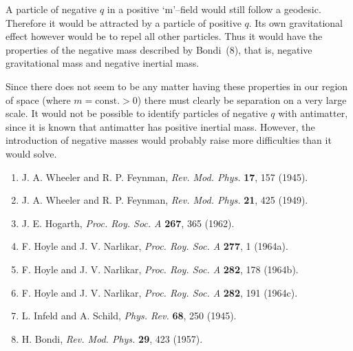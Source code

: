 A particle of negative \(q\) in a positive `m'--field would 
still follow a geodesic. Therefore it would be attracted by 
a particle of positive \(q\). Its own gravitational effect 
however would be to repel all other particles. Thus it would 
have the properties of the negative mass described by Bondi~(8), 
that is, negative gravitational mass and negative inertial mass.

\medskip

Since there does not seem to be any matter having these 
properties in our region of space (where \(m = \text{const.} > 0\)) 
there must clearly be separation on a very large scale. It 
would not be possible to identify particles of negative \(q\) 
with antimatter, since it is known that antimatter has positive 
inertial mass. However, the introduction of negative masses 
would probably raise more difficulties than it would solve.







\begin{enumerate}
\item J. A. Wheeler and R. P. Feynman, 
\textit{Rev. Mod. Phys.} \textbf{17}, 157 (1945).

\item J. A. Wheeler and R. P. Feynman, 
\textit{Rev. Mod. Phys.} \textbf{21}, 425 (1949).

\item J. E. Hogarth, 
\textit{Proc. Roy. Soc. A} \textbf{267}, 365 (1962).

\item F. Hoyle and J. V. Narlikar, 
\textit{Proc. Roy. Soc. A} \textbf{277}, 1 (1964a).

\item F. Hoyle and J. V. Narlikar, 
\textit{Proc. Roy. Soc. A} \textbf{282}, 178 (1964b).

\item F. Hoyle and J. V. Narlikar, 
\textit{Proc. Roy. Soc. A} \textbf{282}, 191 (1964c).

\item L. Infeld and A. Schild, 
\textit{Phys. Rev.} \textbf{68}, 250 (1945).

\item H. Bondi, 
\textit{Rev. Mod. Phys.} \textbf{29}, 423 (1957).
\end{enumerate}


